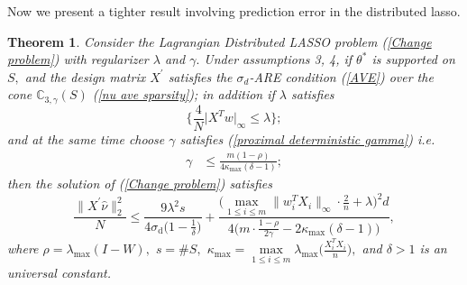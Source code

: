 \documentclass{article}
\theoremstyle{break}
\newtheorem{theorem}{Theorem}
\newcommand{\T}{\theta}
\begin{document}
Now we present a tighter result involving  prediction error in the distributed lasso.
\begin{theorem}\label{deterministic result}
Consider the Lagrangian Distributed LASSO problem (\ref{Change problem}) with regularizer $\lambda$ and $\gamma.$ Under assumptions 3, 4,
  if $\T^*$ is supported on $S,$ and the design matrix $X^{'}$ satisfies the $\sigma_d$-ARE condition (\ref{AVE}) over the cone $\mathbb{C}_{3,\gamma}(S)$ (\ref{nu ave sparsity}); in addition if $\lambda$ satisfies
  \begin{equation}\label{event lambda}
      \{\frac{4}{N}\lvert X^T w\rvert_{\infty}\leq \lambda\};
  \end{equation}
  and at the same time choose $\gamma$ satisfies (\ref{proximal deterministic gamma}) i.e.
\begin{align*}
      \gamma&\leq \frac{m(1-\rho)}{4\kappa_{\max}(\delta-1)};
\end{align*}
then the solution of (\ref{Change problem}) satisfies
\begin{equation}\label{oracle}
   \frac{\lVert X^{'}\hat{\nu}\rVert_2^2}{N}\leq\frac{9\lambda^2s}{4\sigma_{\text{d}}\bigg(1-\frac{1}{\delta}\bigg)}+\frac{\bigg(\max\limits_{1\leq i\leq m}\lVert w_i^TX_i\rVert_{\infty}\cdot \frac{2}{n}+\lambda\bigg)^2d}{4\bigg(m\cdot\frac{1-\rho}{2\gamma}-2\kappa_{\max}(\delta-1)\bigg)},
\end{equation}
where $\rho=\lambda_{\max}(I-W),$ $s=\#S,$ $\kappa_{\max}=\max\limits_{1\leq i\leq m}\lambda_{\max}\bigg(\frac{X_i^T X_i}{n}\bigg),$ and $\delta>1$ is an universal constant.
 
 \end{theorem}
\end{document}
